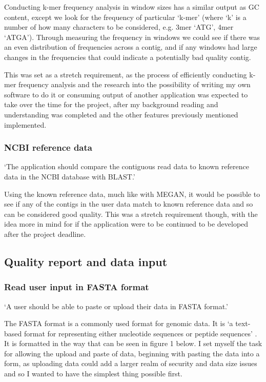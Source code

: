 Conducting k-mer frequency analysis in window sizes has a similar output as GC content, except we look for the frequency of particular `k-mer' (where `k' is a number of how many characters to be considered, e.g. 3mer `ATG', 4mer `ATGA'). Through measuring the frequency in windows we could see if there was an even distribution of frequencies across a contig, and if any windows had large changes in the frequencies that could indicate a potentially bad quality contig.

This was set as a stretch requirement, as the process of efficiently conducting k-mer frequency analysis and the research into the possibility of writing my own software to do it or consuming output of another application was expected to take over the time for the project, after my background reading and understanding was completed and the other features previously mentioned implemented.

\subsubsection{NCBI reference data}
`The application should compare the contiguous read data to known reference data in the NCBI database with BLAST.'

Using the known reference data, much like with MEGAN, it would be possible to see if any of the contigs in the user data match to known reference data and so can be considered good quality. This was a stretch requirement though, with the idea more in mind for if the application were to be continued to be developed after the project deadline.

\subsection{Quality report and data input}
\subsubsection{Read user input in FASTA format}
`A user should be able to paste or upload their data in FASTA format.'

The FASTA format is a commonly used format for genomic data. It is `a text-based format for representing either nucleotide sequences or peptide sequences' \cite{fastaformat}. It is formatted in the way that can be seen in figure 1 below. I set myself the task for allowing the upload and paste of data, beginning with pasting the data into a form, as uploading data could add a larger realm of security and data size issues and so I wanted to have the simplest thing possible first.

